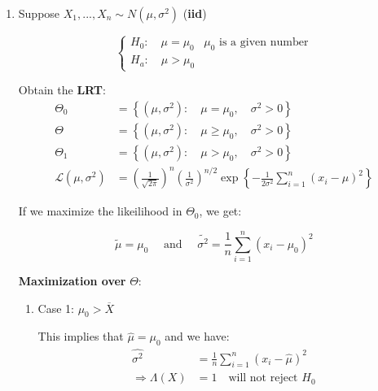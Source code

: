 \documentclass{article}
\begin{document}
\begin{enumerate}
    \item Suppose $X_1,...,X_n \sim N(\mu,\sigma^2)$ (\textbf{iid})
    
    \begin{equation*}
        \begin{cases}
            H_0: \quad \mu = \mu_0 & \text{$\mu_0$ is a given number}\\
            H_a: \quad \mu > \mu_0 & 
        \end{cases}
    \end{equation*}
    
    Obtain the \textbf{LRT}:
    \begin{equation*}
        \begin{split}
            \Theta_0 &= \left\{ (\mu,\sigma^2): \quad \mu=\mu_0,\quad \sigma^2>0 \right\}\\
            \Theta &= \left\{ (\mu,\sigma^2): \quad \mu \geq \mu_0 ,\quad \sigma^2>0 \right\}\\
            \Theta_1 &= \left\{ (\mu,\sigma^2): \quad \mu > \mu_0 ,\quad \sigma^2>0 \right\}\\
            \mathcal{L}(\mu,\sigma^2) &= \left(\frac{1}{\sqrt{2\pi}} \right)^n \left( \frac{1}{\sigma^2}\right)^{n/2} \exp \left\{-\frac{1}{2\sigma^2}\sum_{i=1}^n (x_i-\mu)^2 \right\}
        \end{split}
    \end{equation*}
    
    If we maximize the likeilihood in $\Theta_0$, we get:
    
    \begin{equation*}
        \widetilde{\mu} = \mu_0 \quad \text{ and } \quad \widetilde{\sigma^2} = \frac{1}{n} \sum_{i=1}^n (x_i-\mu_0)^2
    \end{equation*}
    
    \textbf{Maximization over} $\Theta$:
    \begin{enumerate}
        \item Case 1: $\mu_0 > \overline{X}$
        
        This implies that $\hat{\mu} = \mu_0$ and we have:
        \begin{equation*}
        \begin{split}
            \hat{\sigma^2} &= \frac{1}{n} \sum_{i=1}^n (x_i-\hat{\mu})^2\\
            \Rightarrow \Lambda(X) &= 1 \quad \text{will not reject $H_0$}
        \end{split}
        \end{equation*}
        

\end{enumerate}
\end{enumerate}
\end{document}
